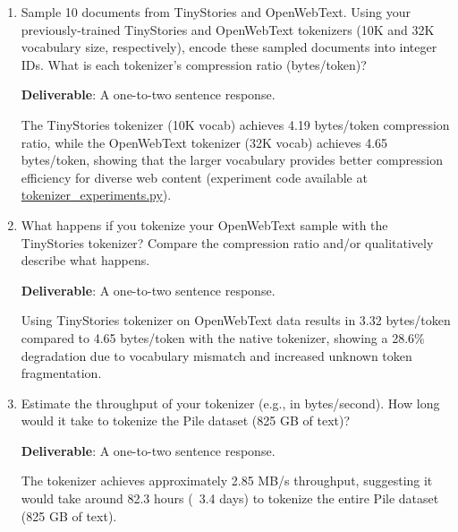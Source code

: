 
\begin{enumerate}[label=(\alph*)]
    \item Sample 10 documents from TinyStories and OpenWebText. Using your previously-trained TinyStories and OpenWebText tokenizers (10K and 32K vocabulary size, respectively), encode these sampled documents into integer IDs. What is each tokenizer's compression ratio (bytes/token)?
    
    \textbf{Deliverable}: A one-to-two sentence response.
    
    \begin{answer}
    The TinyStories tokenizer (10K vocab) achieves 4.19 bytes/token compression ratio, while the OpenWebText tokenizer (32K vocab) achieves 4.65 bytes/token, showing that the larger vocabulary provides better compression efficiency for diverse web content (experiment code available at \href{https://github.com/donglinkang2021/cs336-assignment1-basics/blob/main/data_utils/tokenizer_experiments.py}{tokenizer\_experiments.py}).
    \end{answer}

    \item What happens if you tokenize your OpenWebText sample with the TinyStories tokenizer? Compare the compression ratio and/or qualitatively describe what happens.

    \textbf{Deliverable}: A one-to-two sentence response.

    \begin{answer}
    Using TinyStories tokenizer on OpenWebText data results in 3.32 bytes/token compared to 4.65 bytes/token with the native tokenizer, showing a 28.6\% degradation due to vocabulary mismatch and increased unknown token fragmentation.
    \end{answer}

    \item Estimate the throughput of your tokenizer (e.g., in bytes/second). How long would it take to tokenize the Pile dataset (825 GB of text)?

    \textbf{Deliverable}: A one-to-two sentence response.

    \begin{answer}
    The tokenizer achieves approximately 2.85 MB/s throughput, suggesting it would take around 82.3 hours (~3.4 days) to tokenize the entire Pile dataset (825 GB of text).
    \end{answer}


\end{enumerate}
